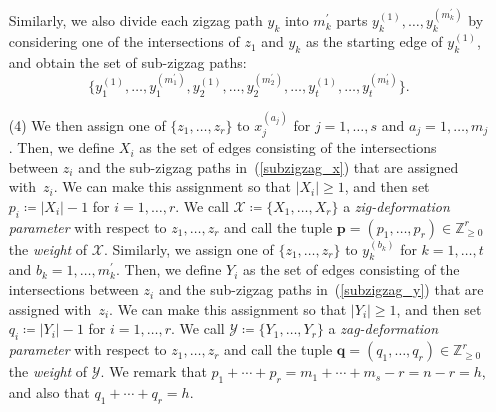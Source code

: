 \documentclass[11pt]{article}
\numberwithin{equation}{section}
\numberwithin{equation}{section}
\numberwithin{figure}{section}
\numberwithin{table}{section}
\newcommand{\ZZ}{\mathbb{Z}}
\newcommand{\calX}{\mathcal{X}}
\newcommand{\calY}{\mathcal{Y}}
\newcommand{\bfp}{\mathbf{p}}
\newcommand{\bfq}{\mathbf{q}}
\begin{document}
\begin{setting}
\begin{itemize}
Similarly, we also divide each zigzag path $y_k$ into $m^\prime_k$ parts $y_k^{(1)},\dots,y_k^{(m^\prime_k)}$
by considering one of the intersections of $z_1$ and $y_k$ as the starting edge of $y_k^{(1)}$, and obtain the set of sub-zigzag paths:
\begin{equation}\label{subzigzag_y}
\big\{y_1^{(1)},\dots,y_1^{(m^\prime_1)}, y_2^{(1)},\dots,y_2^{(m^\prime_2)}, \dots, y_t^{(1)},\dots,y_t^{(m^\prime_t)}\big\}.
\end{equation}
\item[(4)]
We then assign one of $\{z_1, \dots, z_r\}$ to $x_j^{(a_j)}$ for $j=1, \dots, s$ and $a_j=1, \dots, m_j$.
Then, we define $X_i$ as the set of edges consisting of the intersections between $z_i$ and the sub-zigzag paths in~(\ref{subzigzag_x}) that are assigned with~$z_i$.
We can make this assignment so that $|X_i|\ge1$, and then set $p_i\coloneqq|X_i|-1$ for $i=1,\dots,r$.
We call $\calX\coloneqq\{X_1,\dots,X_r\}$ a \emph{zig-deformation parameter} with respect to $z_1,\dots,z_r$ and call the tuple $\bfp=(p_1,\dots,p_r)\in\ZZ^r_{\ge0}$ the \emph{weight} of $\calX$.
Similarly, we assign one of $\{z_1, \dots, z_r\}$ to $y_k^{(b_k)}$ for $k=1, \dots, t$ and $b_k=1, \dots, m^\prime_k$.
Then, we define $Y_i$ as the set of edges consisting of the intersections between $z_i$ and the sub-zigzag paths in~(\ref{subzigzag_y}) that are assigned with~$z_i$.
We can make this assignment so that $|Y_i|\ge1$, and then set $q_i\coloneqq|Y_i|-1$ for $i=1,\dots,r$.
We call $\calY\coloneqq\{Y_1,\dots,Y_r\}$ a \emph{zag-deformation parameter} with respect to $z_1,\dots,z_r$ and call the tuple $\bfq=(q_1,\dots,q_r)\in\ZZ^r_{\ge0}$ the \emph{weight} of $\calY$.
We remark that $p_1+\cdots+p_r=m_1+\cdots+m_s-r=n-r=h$, and also that $q_1+\cdots+q_r=h$.
\end{itemize}
\end{setting}
\end{document}
